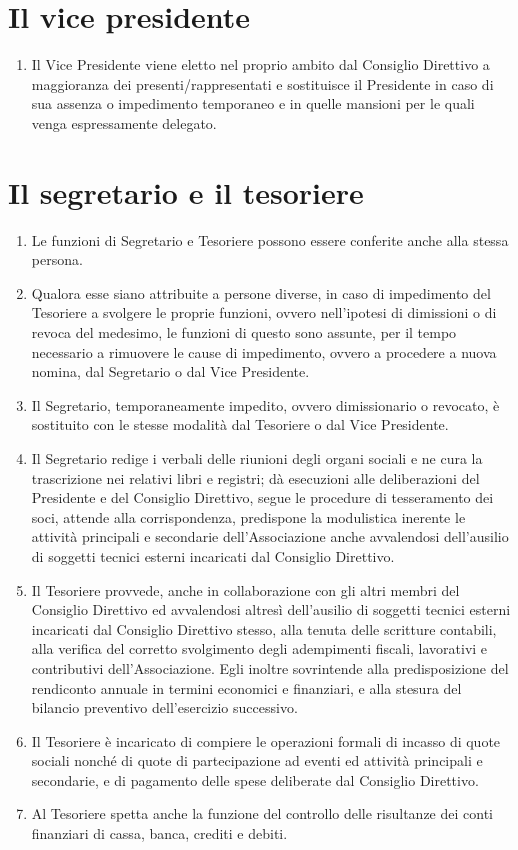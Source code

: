 \documentclass{djtsasddoc}
\begin{document}
	\section{Il vice presidente}
	\begin{enumerate}
		\item Il Vice Presidente viene eletto nel proprio ambito dal Consiglio Direttivo a maggioranza dei presenti/rappresentati e sostituisce il Presidente in caso di sua assenza o impedimento temporaneo e in quelle mansioni per le quali venga espressamente delegato.
	\end{enumerate}
	
	\section{Il segretario e il tesoriere}
	\begin{enumerate}
		\item Le funzioni di Segretario e Tesoriere possono essere conferite anche alla stessa persona.
		\item Qualora esse siano attribuite a persone diverse, in caso di impedimento del Tesoriere a svolgere le proprie funzioni, ovvero nell'ipotesi di dimissioni o di revoca del medesimo, le funzioni di questo sono assunte, per il tempo necessario a rimuovere le cause di impedimento, ovvero a procedere a nuova nomina, dal Segretario o dal Vice Presidente.
		\item Il Segretario, temporaneamente impedito, ovvero dimissionario o revocato, è sostituito con le stesse modalità dal Tesoriere o dal Vice Presidente.
		\item Il Segretario redige i verbali delle riunioni degli organi sociali e ne cura la trascrizione nei relativi libri e registri; dà esecuzioni alle deliberazioni del Presidente e del Consiglio Direttivo, segue le procedure di tesseramento dei soci,  attende alla corrispondenza, predispone la modulistica inerente  le attività principali e secondarie dell'Associazione anche avvalendosi dell'ausilio di soggetti tecnici esterni incaricati dal Consiglio Direttivo.
		\item Il Tesoriere provvede, anche in collaborazione con gli altri membri del Consiglio Direttivo ed avvalendosi altresì dell'ausilio di soggetti tecnici esterni incaricati dal Consiglio Direttivo stesso, alla tenuta delle scritture contabili, alla verifica del corretto svolgimento degli adempimenti fiscali, lavorativi e contributivi dell'Associazione. Egli inoltre sovrintende alla predisposizione del rendiconto annuale in termini economici e finanziari, e alla stesura del bilancio preventivo dell'esercizio successivo.
		\item Il Tesoriere è incaricato di compiere le operazioni formali di incasso di quote sociali nonché di quote di partecipazione ad eventi ed attività principali e secondarie, e di pagamento delle spese deliberate dal Consiglio Direttivo.
		\item Al Tesoriere spetta anche la funzione del controllo delle risultanze dei conti finanziari di cassa, banca, crediti e debiti.
	\end{enumerate}
	
\end{document}

